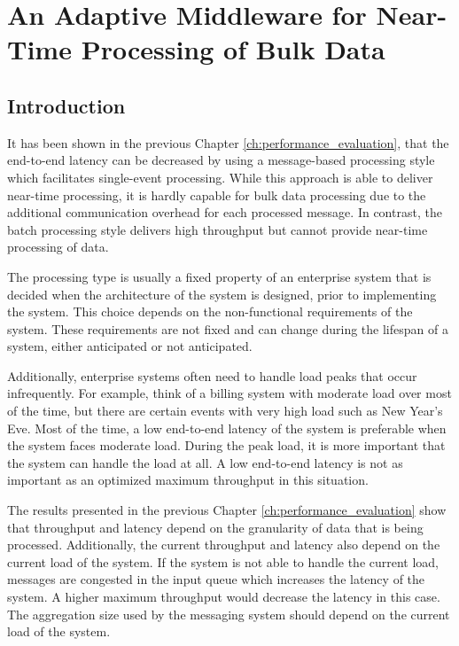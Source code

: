 \chapter{An Adaptive Middleware for Near-Time Processing of Bulk Data}\label{ch:adaptive_middleware}

\section{Introduction}\label{sec:introduction}

It has been shown in the previous Chapter \ref{ch:performance_evaluation}, that the end-to-end latency can be decreased by using a message-based processing style which facilitates single-event processing. While this approach is able to deliver near-time processing, it is hardly capable for bulk data processing due to the additional communication overhead for each processed message. In contrast, the batch processing style delivers high throughput but cannot provide near-time processing of data.

The processing type is usually a fixed property of an enterprise system that is decided when the architecture of the system is designed, prior to implementing the system. This choice depends on the non-functional requirements of the system. These requirements are not fixed and can change during the lifespan of a system, either anticipated or not anticipated.

Additionally, enterprise systems often need to handle load peaks that occur infrequently. For example, think of a billing system with moderate load over most of the time, but there are certain events with very high load such as New Year's Eve. Most of the time, a low end-to-end latency of the system is preferable when the system faces moderate load. During the peak load, it is more important that the system can handle the load at all. A low end-to-end latency is not as important as an optimized maximum throughput in this situation.

The results presented in the previous Chapter \ref{ch:performance_evaluation} show that throughput and latency depend on the granularity of data that is being processed. Additionally, the current throughput and latency also depend on the current load of the system. If the system is not able to handle the current load, messages are congested in the input queue which increases the latency of the system. A higher maximum throughput would decrease the latency in this case. The aggregation size used by the messaging system should depend on the current load of the system.

